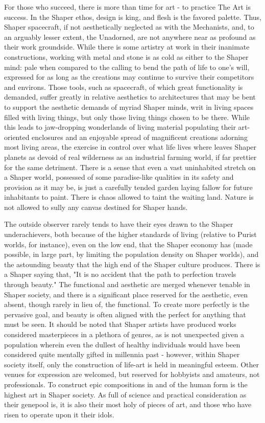 For those who succeed, there is more than time for art - to practice
The Art is success. In the Shaper ethos, design is king, and flesh is
the favored palette. Thus, Shaper spacecraft, if not aesthetically
neglected as with the Mechanists, and, to an arguably lesser extent,
the Unadorned, are not anywhere near as profound as their work
groundside. While there is some artistry at work in their inanimate
constructions, working with metal and stone is as cold as either to
the Shaper mind: pale when compared to the calling to bend the path of
life to one's will, expressed for as long as the creations may
continue to survive their competitors and environs. Those tools, such
as spacecraft, of which great functionality is demanded, suffer
greatly in relative aesthetics to architectures that may be bent to
support the aesthetic demands of myriad Shaper minds, writ in living
spaces filled with living things, but only those living things chosen
to be there. While this leads to jaw-dropping wonderlands of living
material populating their art-oriented enclosures and an enjoyable
spread of magnificent creations adorning most living areas, the
exercise in control over what life lives where leaves Shaper planets
as devoid of real wilderness as an industrial farming world, if far
prettier for the same detriment. There is a sense that even a vast
uninhabited stretch on a Shaper world, possessed of some paradise-like
qualities in its safety and provision as it may be, is just a
carefully tended garden laying fallow for future inhabitants to
paint. There is chaos allowed to taint the waiting land. Nature is not
allowed to sully any canvas destined for Shaper hands.

The outside observer rarely tends to have their eyes drawn to the
Shaper underachievers, both because of the higher standards of living
(relative to Purist worlds, for instance), even on the low end, that
the Shaper economy has (made possible, in large part, by limiting the
population density on Shaper worlds), and the astounding beauty that
the high end of the Shaper culture produces. There is a Shaper saying
that, "It is no accident that the path to perfection travels through
beauty." The functional and aesthetic are merged whenever tenable in
Shaper society, and there is a significant place reserved for the
aesthetic, even absent, though rarely in lieu of, the functional. To
create more perfectly is the pervasive goal, and beauty is often
aligned with the perfect for anything that must be seen. It should be
noted that Shaper artists have produced works considered masterpieces
in a plethora of genres, as is not unexpected given a population
wherein even the dullest of healthy individuals would have been
considered quite mentally gifted in millennia past - however, within
Shaper society itself, only the construction of life-art is held in
meaningful esteem. Other venues for expression are welcomed, but
reserved for hobbyists and amateurs, not professionals. To construct
epic compositions in and of the human form is the highest art in
Shaper society. As full of science and practical consideration as
their genepool is, it is also their most holy of pieces of art, and
those who have risen to operate upon it their idols.

